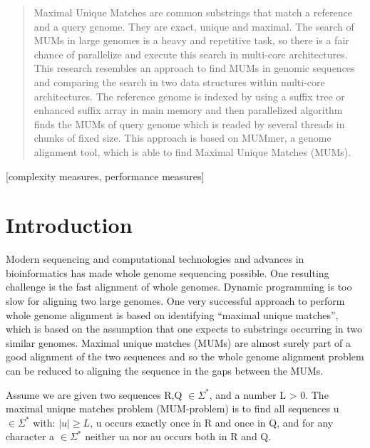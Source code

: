 \documentclass{acm_proc_article-sp}
\begin{document}
\maketitle
\begin{abstract}
  Maximal Unique Matches are common substrings that match a reference and a query genome. They are exact, unique and maximal. The search of MUMs in large genomes is a heavy and repetitive task, so there is a fair chance of parallelize and execute this search in multi-core architectures. This research resembles an approach to find MUMs in genomic sequences and comparing the search in two data structures within multi-core architectures. The reference genome is indexed by using a suffix tree or enhanced suffix array in main memory and then parallelized algorithm finds the MUMs of query genome which is readed by several threads in chunks of fixed size. This approach is based on MUMmer, a genome alignment tool, which is able to find Maximal Unique Matches (MUMs). 
\end{abstract}

[complexity measures, performance measures]



\section{Introduction} 
Modern sequencing and computational technologies and advances in bioinformatics has made whole genome sequencing possible. One resulting challenge is the fast alignment of whole genomes. Dynamic programming is too slow for aligning two large genomes. One very successful approach to perform whole genome alignment is based on identifying ``maximal unique matches'', which is based on the assumption that one expects to substrings occurring in two similar genomes.
Maximal unique matches (MUMs) are almost surely part of a good alignment of the two sequences and so the whole genome alignment problem can be reduced to aligning the sequence in the gaps between the MUMs.

\begin{definition}
Assume we are given two sequences R,Q $\in \Sigma^*$, and a number L > 0. The maximal unique matches problem (MUM-problem) is to find all sequences u $\in \Sigma^*$ with: $|u|\geq L$, u occurs exactly once in R and once in Q, and for any character a $\in \Sigma^*$ neither ua nor au occurs both in R and Q.
\end{definition}
\end{document}
